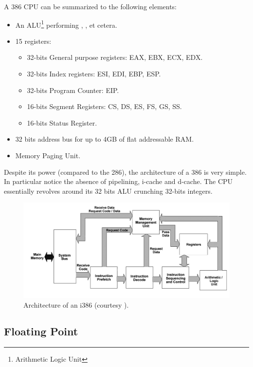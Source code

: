 \documentclass[book.tex]{subfiles}
\begin{document}
A 386 CPU can be summarized to the following elements:
\begin{itemize}
\item An ALU\footnote{Arithmetic Logic Unit} performing , ,  et cetera.
\item 15 registers:
\begin{itemize}
  \item 32-bits General purpose registers: EAX, EBX, ECX, EDX.
  \item 32-bits Index registers: ESI, EDI, EBP, ESP.
  \item 32-bits Program Counter: EIP.
  \item 16-bits Segment Registers: CS, DS, ES, FS, GS, SS.
  \item 16-bits Status Register.
\end{itemize}
\item 32 bits address bus for up to 4GB of flat addressable RAM.
\item Memory Paging Unit.
\end{itemize}
 
\par
Despite its power (compared to the 286), the architecture of a 386 is very simple. In particular notice the absence of pipelining, i-cache and d-cache. The CPU essentially revolves around its 32 bits ALU crunching 32-bits integers.

\begin{figure}[H]
\centering
  
      \includegraphics[width=\textwidth]{imgs/drawings/80386DX_arch.png}
\caption{Architecture of an i386 (courtesy ).}
\end{figure}








  \subsection{Floating Point}
  
\end{document}
